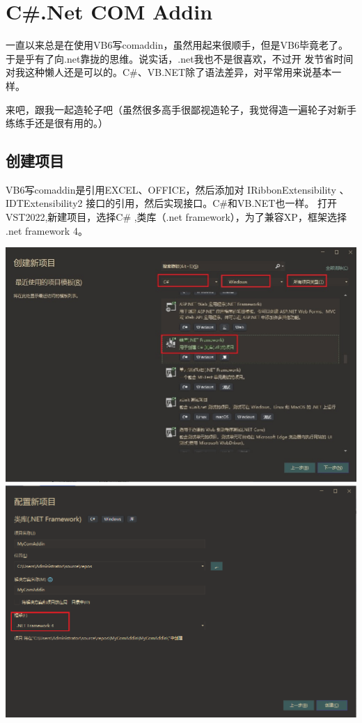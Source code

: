\documentclass[math,code]{amznotes}
\begin{document}
    \tableofcontents

    \chapter{C\#.Net COM Addin}
	一直以来总是在使用VB6写comaddin，虽然用起来很顺手，但是VB6毕竟老了。于是乎有了向.net靠拢的思维。说实话，.net我也不是很喜欢，不过开
	发节省时间对我这种懒人还是可以的。C\#、VB.NET除了语法差异，对平常用来说基本一样。
	
	来吧，跟我一起造轮子吧（虽然很多高手很鄙视造轮子，我觉得造一遍轮子对新手练练手还是很有用的。）\cite{VBnet_ComAddin}
    \section{创建项目}
    
    VB6写comaddin是引用EXCEL、OFFICE，然后添加对 IRibbonExtensibility 、IDTExtensibility2 \cite{IDTExtensibility2}接口的引用，然后实现接口。C\#和VB.NET也一样。
    打开VST2022,新建项目，选择C\# ,类库（.net framework），为了兼容XP，框架选择 .net framework 4。
    
    	\includegraphics[width=0.5\linewidth]{pic/createProject}
    	\includegraphics[width=0.5\linewidth]{pic/myComAddin}
    
\end{document}
